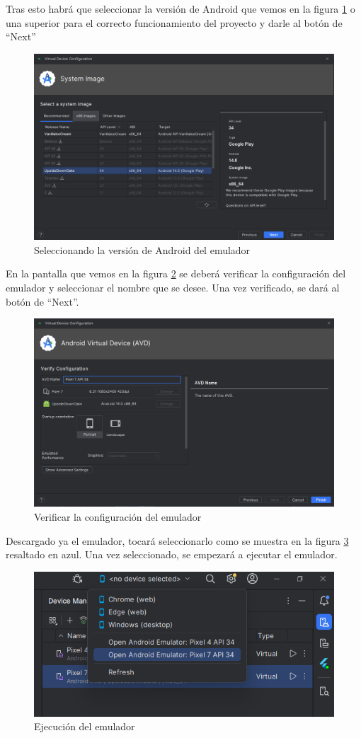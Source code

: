 Tras esto habrá que seleccionar la versión de Android que vemos en la figura \ref{C14} o una superior para el correcto funcionamiento del proyecto y darle al botón de ``Next''

\begin{figure}[H]
    \centering
    \includegraphics[width=0.8\linewidth]{InstalacionyEjecucion3.png}
    \caption{Seleccionando la versión de Android del emulador}
    \label{C14}
\end{figure}

En la pantalla que vemos en la figura \ref{C15} se deberá verificar la configuración del emulador y seleccionar el nombre que se desee. Una vez verificado, se dará al botón de ``Next''.

\begin{figure}[H]
    \centering
    \includegraphics[width=0.8\linewidth]{InstalacionyEjecucion4.png}
    \caption{Verificar la configuración del emulador}
    \label{C15}
\end{figure}

Descargado ya el emulador, tocará seleccionarlo como se muestra en la figura \ref{C16} resaltado en azul. Una vez seleccionado, se empezará a ejecutar el emulador.

\begin{figure}[H]
    \centering
    \includegraphics[width=0.8\linewidth]{InstalacionyEjecucion5.png}
    \caption{Ejecución del emulador}
    \label{C16}
\end{figure}

